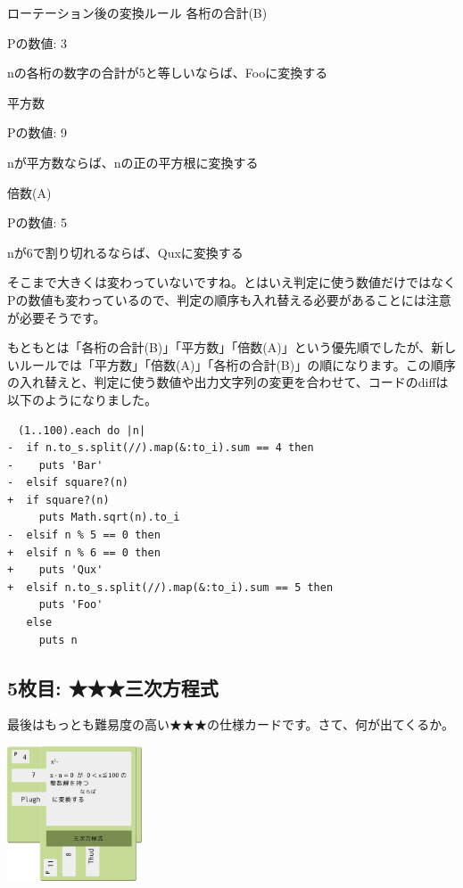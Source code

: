 \documentclass[index]{subfiles}
\begin{document}
\begin{itembox}[l]{ローテーション後の変換ルール}
{\sf 各桁の合計(B)}

\hspace{1em}Pの数値: 3

\hspace{1em}nの各桁の数字の合計が5と等しいならば、Fooに変換する

{\sf 平方数}

\hspace{1em}Pの数値: 9

\hspace{1em}nが平方数ならば、nの正の平方根に変換する

{\sf 倍数(A)}

\hspace{1em}Pの数値: 5

\hspace{1em}nが6で割り切れるならば、Quxに変換する
\end{itembox}

そこまで大きくは変わっていないですね。とはいえ判定に使う数値だけではなくPの数値も変わっているので、判定の順序も入れ替える必要があることには注意が必要そうです。

もともとは「各桁の合計(B)」「平方数」「倍数(A)」という優先順でしたが、新しいルールでは「平方数」「倍数(A)」「各桁の合計(B)」の順になります。この順序の入れ替えと、判定に使う数値や出力文字列の変更を合わせて、コードのdiffは以下のようになりました。

\begin{lstlisting}
　(1..100).each do |n|
-  if n.to_s.split(//).map(&:to_i).sum == 4 then
-    puts 'Bar'
-  elsif square?(n)
+  if square?(n)
     puts Math.sqrt(n).to_i
-  elsif n % 5 == 0 then
+  elsif n % 6 == 0 then
+    puts 'Qux'
+  elsif n.to_s.split(//).map(&:to_i).sum == 5 then
     puts 'Foo'
   else
     puts n
\end{lstlisting}

  \subsection{5枚目: ★★★三次方程式}

最後はもっとも難易度の高い★★★の仕様カードです。さて、何が出てくるか。

\begin{center}
  \includegraphics[height=4cm]{image/207_replay_1_7.png}
\end{center}
\end{document}
